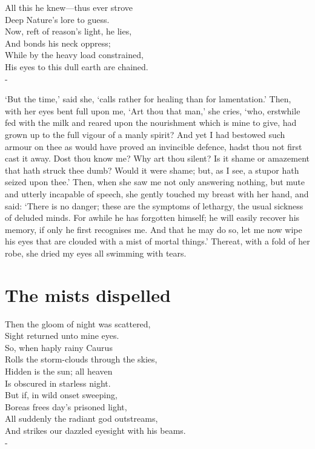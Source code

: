 \documentclass[12pt]{book}
\newenvironment{ipoem}[1]%
  {\setcounter{poemindentevery}{#1}\begin{poem}\small}%
  {\end{poem}\setcounter{poemindentevery}{0}}
\newenvironment{vpoem}[1]%
  {\def\poemvsindentlines{#1}\begin{poem}\small}%
  {\end{poem}\def\poemvsindentlines{\relax}}
\begin{document}
\begin{vpoem}{24}
    All this he knew---thus ever strove \\
      Deep Nature's lore to guess. \\
    Now, reft of reason's light, he lies, \\
      And bonds his neck oppress; \\
    While by the heavy load constrained, \\
    His eyes to this dull earth are chained. \\-
\end{vpoem}

`But the time,' said she, `calls rather for healing than for
lamentation.' Then, with her eyes bent full upon me, `Art thou that
man,' she cries, `who, erstwhile fed with the milk and reared upon the
nourishment which is mine to give, had grown up to the full vigour of a
manly spirit? And yet I had bestowed such armour on thee as would have
proved an invincible defence, hadst thou not first cast it away. Dost
thou know me? Why art thou silent? Is it shame or amazement that hath
struck thee dumb? Would it were shame; but, as I see, a stupor hath
seized upon thee.' Then, when she saw me not only answering nothing, but
mute and utterly incapable of speech, she gently touched my breast with
her hand, and said: `There is no danger; these are the symptoms of
lethargy, the usual sickness of deluded minds. For awhile he has
forgotten himself; he will easily recover his memory, if only he first
recognises me. And that he may do so, let me now wipe his eyes that are
clouded with a mist of mortal things.' Thereat, with a fold of her robe,
she dried my eyes all swimming with tears.



\section{The mists dispelled}

\begin{ipoem}{2}
    Then the gloom of night was scattered, \\
      Sight returned unto mine eyes. \\
    So, when haply rainy Caurus \\
      Rolls the storm-clouds through the skies, \\
    Hidden is the sun; all heaven \\
      Is obscured in starless night. \\
    But if, in wild onset sweeping, \\
      Boreas frees day's prisoned light, \\
    All suddenly the radiant god outstreams, \\
    And strikes our dazzled eyesight with his beams. \\-
\end{ipoem}
\end{document}
